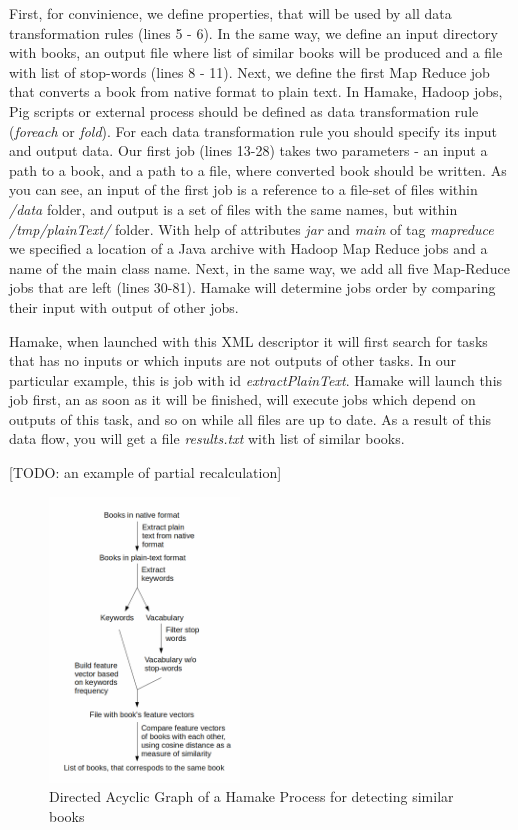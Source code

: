 \documentclass[10pt,conference,letterpaper]{IEEEtran}
\begin{document}
First, for convinience, we define properties, that will be used by all
data transformation rules (lines 5 - 6). In the same way, we define an
input directory with books, an output file where list of similar books
will be produced and a file with list of stop-words (lines 8 - 11).
Next, we define the first Map Reduce job that converts a book from
native format to plain text. In Hamake, Hadoop jobs, Pig scripts or
external process should be defined as data transformation rule
(\textit{foreach} or \textit{fold}). For each data transformation rule
you should specify its input and output data. Our first job (lines
13-28) takes two parameters - an input a path to a book, and a path to
a file, where converted book should be written.  As you can see, an
input of the first job is a reference to a file-set of files within
\textit{/data} folder, and output is a set of files with the same
names, but within \textit{/tmp/plainText/} folder. With help of
attributes \textit{jar} and \textit{main} of tag \textit{mapreduce} we
specified a location of a Java archive with Hadoop Map Reduce jobs and
a name of the main class name. Next, in the same way, we add all five
Map-Reduce jobs that are left (lines 30-81). Hamake will determine
jobs order by comparing their input with output of other jobs.



Hamake, when launched with this XML descriptor it will first search
for tasks that has no inputs or which inputs are not outputs of other
tasks. In our particular example, this is job with id
\textit{extractPlainText}. Hamake will launch this job first, an as
soon as it will be finished, will execute jobs which depend on outputs
of this task, and so on while all files are up to date. As a result of
this data flow, you will get a file \textit{results.txt} with list of
similar books.

[TODO: an example of partial recalculation]

\begin{figure}[htp]
\centering
\includegraphics[width=0.45\textwidth]{SimilarityAlgDAG.png}
\caption{Directed Acyclic Graph of a Hamake Process for detecting similar books}
\label{fig:SimilarityAlgDAG}
\end{figure}
\end{document}
